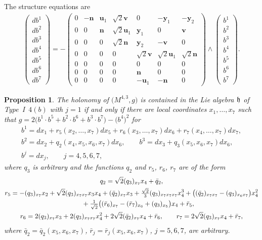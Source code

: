 \documentclass[pdftex]{sigma}
\numberwithin{equation}{section}
\newtheorem{Proposition}[Theorem]{Proposition}
 { \theoremstyle{definition}
\newtheorem{Definition}[Theorem]{Definition}
\newtheorem{Example}[Theorem]{Example}
\newtheorem{Remark}[Theorem]{Remark} }
\newcommand\fh{{\frak h}}
\newcommand\bu{{\mathbf u}}
\newcommand\by{{\mathbf y}}
\newcommand\bn{{\mathbf n}}
\newcommand\bv{{\mathbf v}}
\begin{document}
The structure equations are
\begin{gather}\label{EI4(b)j=1}\left(\begin{matrix} db^1\\db^2\\db^3\\db^4\\db^5\\db^6\\db^7\end{matrix}\right) = -\left(
\begin{matrix}
0 &-\bn&\bu_1&\sqrt 2 \bv&0&-\by_1&-\by_2\\
0&0&\bn&\sqrt2 \bu_1&\by_1&0&\bv\\
0&0&0&\sqrt 2 \bn&\by_2&-\bv&0\\
0&0&0&0&\sqrt 2 \bv&\sqrt2 \bu_1&\sqrt 2 \bn\\
0&0&0&0&0&0&0\\
0&0&0&0&\bn&0&0\\
0&0&0&0&-\bu_1&-\bn&0
\end{matrix}\right) \wedge \left(\begin{matrix} b^1\\b^2\\b^3\\b^4\\b^5\\b^6\\b^7\end{matrix}\right).
\end{gather}
%
\begin{Proposition} The holonomy of $\big(M^{4,3},g\big)$ is contained in the Lie algebra $\fh$ of Type~I~$4(b)$ with $j=1$
if and only if there are local coordinates $x_1,\dots,x_7$ such that $g=2\big(b^1\cdot b^5+b^2\cdot b^6+b^3\cdot b^7\big)- \big(b^4\big)^2$ for
\begin{gather*}
b^1= dx_1 + r_5(x_2,\dots, x_7)dx_5+r_6(x_3,\dots,x_7)dx_6+r_7(x_4,\dots,x_7)dx_7, \nonumber \\
b^2= dx_2 +q_2(x_4,x_5,x_6,x_7) dx_6, \qquad
b^3= dx_3+q_3(x_5,x_6,x_7) dx_6 ,\\ %
b^j= dx_j, \qquad j=4,5,6,7,
\end{gather*}
where $q_3$ is arbitrary and the functions $q_2$ and $r_5$, $r_6$, $r_7$ are of the form
\begin{gather*}
q_2 = \sqrt2 (q_3)_{x_7}x_4 +\bar q_2,\\
r_5 = -(q_3)_{x_7}x_2+\sqrt2 (q_3)_{x_7 x_7}x_3 x_4+(\bar q_2)_{x_7}x_3+ \tfrac{\sqrt2}3(q_3)_{x_7 x_7 x_7}x_4^3+\big((\bar q_2)_{x_7 x_7}-(q_3)_{x_6 x_7}\big)x_4^2 \\
 \hphantom{r_5 =}{} + \tfrac1 {\sqrt2}\big((\bar r_6)_{x_7}-(\bar r_7)_{x_6}+(q_3)_{x_5}\big)x_4+\bar r_5, \\
r_6 = 2(q_3)_{x_7}x_3+2(q_3)_{x_7 x_7}x_4^2+2\sqrt2(\bar q_2)_{x_7} x_4+\bar r_6, \qquad
r_7 = 2\sqrt2 (q_3)_{x_7}x_4+\bar r_7,
\end{gather*}
where $\bar q_2=\bar q_2(x_5,x_6,x_7)$, $\bar r_j =\bar r_j (x_5,x_6,x_7)$, $j=5,6,7$, are arbitrary.
\end{Proposition}
\end{document}
